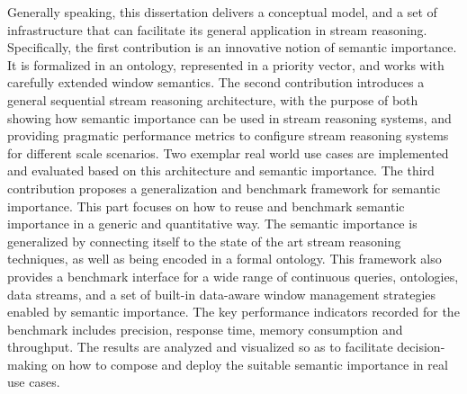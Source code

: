 Generally speaking, this dissertation delivers a conceptual model, and a set of infrastructure that can facilitate its general application in stream reasoning. 
Specifically, the first contribution is an innovative notion of semantic importance.
It is formalized in an ontology, represented in a priority vector, and works with carefully extended window semantics. 
The second contribution introduces a general sequential stream reasoning architecture, with the purpose of both showing how semantic importance can be used in stream reasoning systems, and providing pragmatic performance metrics to configure stream reasoning systems for different scale scenarios. 
Two exemplar real world use cases are implemented and evaluated based on this architecture and semantic importance.
The third contribution proposes a generalization and benchmark framework for semantic importance. 
This part focuses on how to reuse and benchmark semantic importance in a generic and quantitative way.
The semantic importance is generalized by connecting itself to the state of the art stream reasoning techniques, as well as being encoded in a formal ontology. 
This framework also provides a benchmark interface for a wide range of continuous queries, ontologies, data streams, and a set of built-in data-aware window management strategies enabled by semantic importance. 
The key performance indicators recorded for the benchmark includes precision, response time, memory consumption and throughput. 
The results are analyzed and visualized so as to facilitate decision-making on how to compose and deploy the suitable semantic importance in real use cases. 


